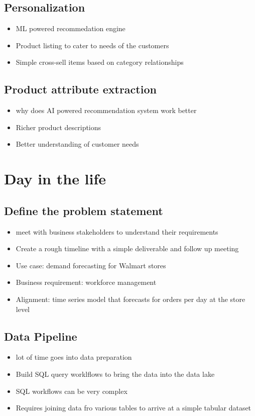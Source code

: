 \documentclass[11pt]{article}
\theoremstyle{definition}
\begin{document}
\subsection{Personalization}
\begin{itemize}
    \item ML powered recommedation engine
    \item Product listing to cater to needs of the customers
    \item Simple cross-sell items based on category relationships
\end{itemize}

\subsection{Product attribute extraction}
\begin{itemize}
    \item why does AI powered recommendation system work better
    \item Richer product descriptions
    \item Better understanding of customer needs
\end{itemize}

\section{Day in the life}
\subsection{Define the problem statement}
\begin{itemize}
    \item meet with business stakeholders to understand their requirements
    \item Create a rough timeline with a simple deliverable and follow up meeting
    \item Use case: demand forecasting for Walmart stores
\end{itemize}

\begin{itemize}
    \item Business requirement: workforce management
    \item Alignment: time series model that forecasts for orders per day at the store level
\end{itemize}

\subsection{Data Pipeline}
\begin{itemize}
    \item lot of time goes into data preparation
    \item Build SQL query worklflows to bring the data into the data lake
    \item SQL workflows can be very complex
    \item Requires joining data fro various tables to arrive at a simple tabular dataset
\end{itemize}
\end{document}
